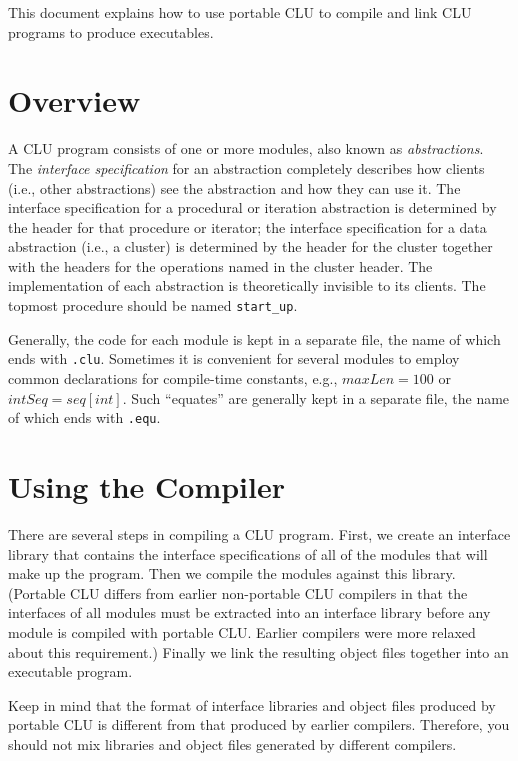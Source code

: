 \maketitle

\noindent This document explains how to use portable CLU to compile
and link CLU programs to produce executables.

\section{Overview}

A CLU program consists of one or more modules, also known as {\em
abstractions}.  The {\em interface specification} for an abstraction
completely describes how clients (i.e., other abstractions) see the
abstraction and how they can use it.  The interface specification for
a procedural or iteration abstraction is determined by the header for
that procedure or iterator; the interface specification for a data
abstraction (i.e., a cluster) is determined by the header for the
cluster together with the headers for the operations named in the
cluster header.  The implementation of each abstraction is
theoretically invisible to its clients.  The topmost procedure should
be named \verb|start_up|.

Generally, the code for each module is kept in a separate file, the
name of which ends with \verb|.clu|.  Sometimes it is convenient for
several modules to employ common declarations for compile-time
constants, e.g., $maxLen = 100$ or $intSeq = seq[int]$.  Such
``equates'' are generally kept in a separate file, the name of which
ends with \verb|.equ|.

\section{Using the Compiler}

There are several steps in compiling a CLU program. First, we create
an interface library that contains the interface specifications of all
of the modules that will make up the program. Then we compile the
modules against this library. (Portable CLU differs from earlier
non-portable CLU compilers in that the interfaces of all modules must
be extracted into an interface library before any module is compiled
with portable CLU.  Earlier compilers were more relaxed about this
requirement.)  Finally we link the resulting object files together
into an executable program.

Keep in mind that the format of interface libraries and object files
produced by portable CLU is different from that produced by earlier
compilers. Therefore, you should not mix libraries and object files
generated by different compilers.

